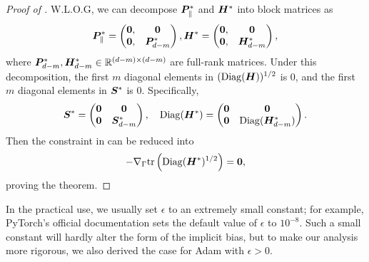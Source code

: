 \begin{proof}[Proof of ]
W.L.O.G, we can decompose ${\bm{P}}_{\parallel}^*$ and ${\bm{H}}^*$ into block matrices as
\begin{align*}
    {\bm{P}}_{\parallel}^* = \begin{pmatrix}
        \boldsymbol{0},& \boldsymbol{0}\\
         \boldsymbol{0}, & {\bm{P}}^*_{d-m}
    \end{pmatrix},
    {\bm{H}}^* = \begin{pmatrix}
        \boldsymbol{0},& \boldsymbol{0}\\
         \boldsymbol{0}, & {\bm{H}}^*_{d-m}
    \end{pmatrix},
\end{align*}
where ${\bm{P}}^*_{d-m},{\bm{H}}^*_{d-m}\in\mathbb{R}^{(d-m)\times (d-m)}$ are full-rank matrices. Under this decomposition, the first $m$ diagonal elements in  $(\mathrm{Diag}({\bm{H}}))^{1/2}$ is $0$, and the first $m$ diagonal elements in  ${\bm{S}}^*$ is $0$. Specifically,
\begin{align*}
    {\bm{S}}^* = \begin{pmatrix}
        {\bm{0}} & {\bm{0}}\\
        {\bm{0}} & {\bm{S}}^*_{d-m}
    \end{pmatrix},
    \quad
    \mathrm{Diag}({\bm{H}}^*) = \begin{pmatrix}
        {\bm{0}} & {\bm{0}}\\
         {\bm{0}} & \mathrm{Diag}({\bm{H}}^*_{d-m})
    \end{pmatrix}.
\end{align*}
Then the constraint in  can be reduced into
\begin{align} \label{equ:constraint-for-Phi-eps-0-simplified}
    -\nabla_{\Gamma}\text{tr}\left(\mathrm{Diag}({\bm{H}}^*)^{1/2}\right) = {\bm{0}},
\end{align}
proving the theorem.
\end{proof}

In the practical use, we usually set $\epsilon$ to an extremely small constant; for example, PyTorch's official documentation sets the default value of $\epsilon$ to $10^{-8}$. Such a small constant will hardly alter the form of the implicit bias, but to make our analysis more rigorous, we also derived the case for Adam with $\epsilon > 0$.

